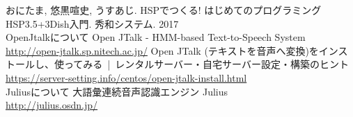 \documentclass[a4paper]{ltjsbook}
\begin{document}
  
  
  
  
  
  
  
  
  
  
  
  
  
  
  
  
  \begin{thebibliography}{99}
   おにたま, 悠黒喧史, うすあじ. HSPでつくる! はじめてのプログラミング HSP3.5+3Dish入門. 秀和システム. 2017
  \\ OpenJtalkについて
   Open JTalk - HMM-based Text-to-Speech System \\ \url{http://open-jtalk.sp.nitech.ac.jp/}
   Open JTalk (テキストを音声へ変換)をインストールし、使ってみる | レンタルサーバー・自宅サーバー設定・構築のヒント \\ \url{https://server-setting.info/centos/open-jtalk-install.html}
  \\ Juliusについて
   大語彙連続音声認識エンジン Julius \\ \url{http://julius.osdn.jp/}
  \end{thebibliography}
\end{document}
